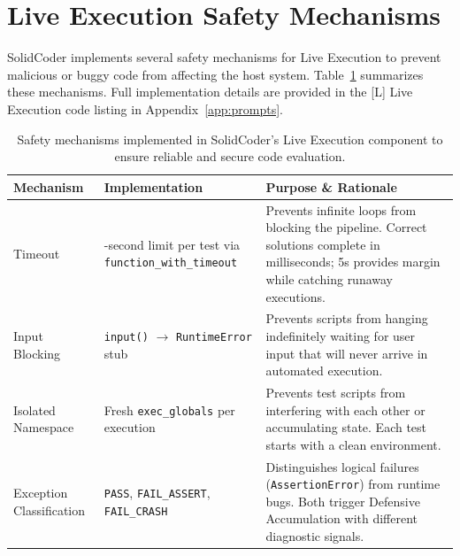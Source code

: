 \documentclass[11pt]{article}
\begin{document}
\section{Live Execution Safety Mechanisms}
\label{app:safety}

SolidCoder implements several safety mechanisms for Live Execution to prevent malicious or buggy code from affecting the host system. Table~\ref{tab:safety} summarizes these mechanisms. Full implementation details are provided in the \textcolor[rgb]{0.6, 0.6, 0.0}{[L] Live Execution} code listing in Appendix~\ref{app:prompts}.

\begin{table}[t]
\centering
\small
\renewcommand{\arraystretch}{1.3}
\begin{tabular}{@{}>{\raggedright\arraybackslash}p{2.8cm}>{\raggedright\arraybackslash}p{4.2cm}>{\raggedright\arraybackslash}p{8.5cm}@{}}
\toprule
\rowcolor{SafetyColor!15}
\textbf{Mechanism} & \textbf{Implementation} & \textbf{Purpose \& Rationale} \\
\midrule
Timeout & 5-second limit per test via \texttt{function\_with\_timeout} & Prevents infinite loops from blocking the pipeline. Correct solutions complete in milliseconds; 5s provides margin while catching runaway executions. \\
\arrayrulecolor{gray!30}\hline\arrayrulecolor{black}
Input Blocking & \texttt{input()} $\rightarrow$ \texttt{RuntimeError} stub & Prevents scripts from hanging indefinitely waiting for user input that will never arrive in automated execution. \\
\arrayrulecolor{gray!30}\hline\arrayrulecolor{black}
Isolated Namespace & Fresh \texttt{exec\_globals} per execution & Prevents test scripts from interfering with each other or accumulating state. Each test starts with a clean environment. \\
\arrayrulecolor{gray!30}\hline\arrayrulecolor{black}
Exception Classification & \texttt{PASS}, \texttt{FAIL\_ASSERT}, \texttt{FAIL\_CRASH} & Distinguishes logical failures (\texttt{AssertionError}) from runtime bugs. Both trigger Defensive Accumulation with different diagnostic signals. \\
\bottomrule
\end{tabular}
\caption{Safety mechanisms implemented in SolidCoder's Live Execution component to ensure reliable and secure code evaluation.}
\label{tab:safety}
\end{table}

\onecolumn
\end{document}
